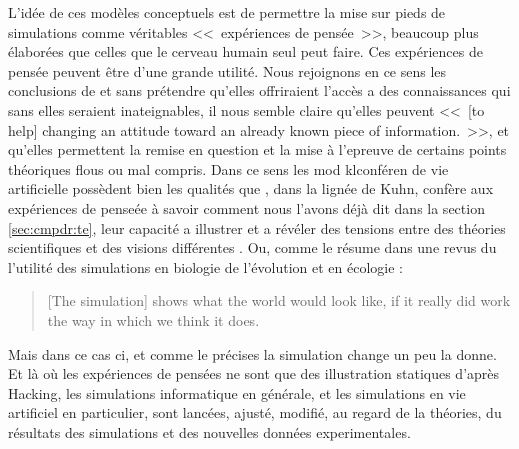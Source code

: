 L'idée de ces modèles conceptuels est de permettre la mise sur pieds de simulations comme véritables <<~expériences de pensée~>>, beaucoup plus élaborées que celles que le cerveau humain seul peut faire. Ces expériences de pensée peuvent être d'une grande utilité. Nous rejoignons en ce sens les conclusions de \citet{paolo00simulationmodelsasopaquethoughtexperiments} et sans prétendre qu'elles offriraient l'accès a des connaissances qui sans elles seraient inateignables, il nous semble claire qu'elles peuvent <<~[to help] changing an attitude toward an already known piece of information.~>>, et qu'elles permettent la remise en question et la mise à l'epreuve de certains points théoriques flous ou mal compris.
Dans ce sens les mod klconféren de vie artificielle possèdent bien les qualités que \citet{hacking92dothoughtexperimentshavealifeoftheirown}, dans la lignée de Kuhn, confère aux expériences de penseée  à savoir comment nous l'avons déjà dit dans la section \ref{sec:cmpdr:te}, leur capacité a illustrer et a révéler des tensions entre des théories scientifiques et des visions différentes \citep[p. 304]{hacking92dothoughtexperimentshavealifeoftheirown}. Ou, comme le résume \citet{peck04simulationasexperiment} dans une revus du l'utilité des simulations en biologie de l'évolution et en écologie : 
\begin{quote}
	[The simulation] shows what the world would look like, if it really did work the way in which we think it does.
	\citet[p. 533]{peck04simulationasexperiment}
\end{quote}
Mais dans ce cas ci, et comme le précises \cite{winsberg03simulatedexperimentsmethodologyforavirtualworld} la simulation change un peu la donne. Et là où les expériences de pensées ne sont que des illustration statiques d'après Hacking, les simulations informatique en générale, et les simulations en vie artificiel en particulier, sont lancées, ajusté, modifié, au regard de la théories, du résultats des simulations et des nouvelles données experimentales. 



